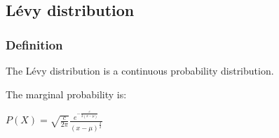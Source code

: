 
\subsection{Lévy distribution}

\subsubsection{Definition}

The Lévy distribution is a continuous probability distribution.

The marginal probability is:

\(P(X)=\sqrt {\frac{c}{2\pi }}\frac{e^{-\frac{c}{2(x-\mu )}}}{(x-\mu )^{\frac{3}{2}}}\)


